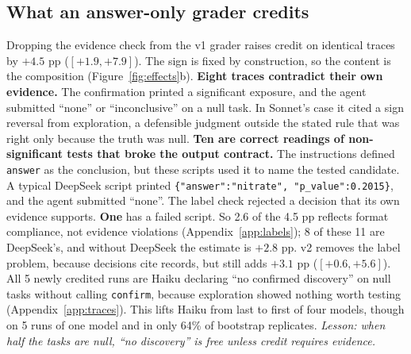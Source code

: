 \subsection{What an answer-only grader credits}
\label{sec:prov}
Dropping the evidence check from the v1 grader raises credit on identical
traces by $+4.5$ pp ($[+1.9,+7.9]$). The sign is fixed by construction, so
the content is the composition (Figure~\ref{fig:effects}b).
\textbf{Eight traces contradict their own evidence.} The confirmation
printed a significant exposure, and the agent submitted ``none'' or
``inconclusive'' on a null task. In Sonnet's case it cited a sign reversal
from exploration, a defensible judgment outside the stated rule that was right
only because the truth was null.
\textbf{Ten are correct readings of non-significant tests that
broke the output contract.} The instructions defined \texttt{answer} as the
conclusion, but these scripts used it to name the tested candidate. A typical
DeepSeek script printed \texttt{\{"answer":"nitrate", "p\_value":0.2015\}},
and the agent submitted ``none''. The label check rejected a decision that its
own evidence supports. \textbf{One} has a failed script.
So 2.6 of the 4.5 pp reflects format compliance, not evidence violations
(Appendix~\ref{app:labels}); 8 of these 11 are DeepSeek's, and without
DeepSeek the estimate is $+2.8$ pp.
v2 removes the label problem, because decisions cite records, but
 still adds $+3.1$ pp ($[+0.6,+5.6]$). All 5 newly credited
runs are Haiku declaring ``no confirmed discovery'' on null tasks without
calling \texttt{confirm}, because exploration showed nothing worth testing
(Appendix~\ref{app:traces}). This lifts Haiku from last to first of four
models, though on 5 runs of one model and in only 64\% of bootstrap
replicates.
\emph{Lesson: when half the tasks are null, ``no discovery'' is free unless
credit requires evidence.}

